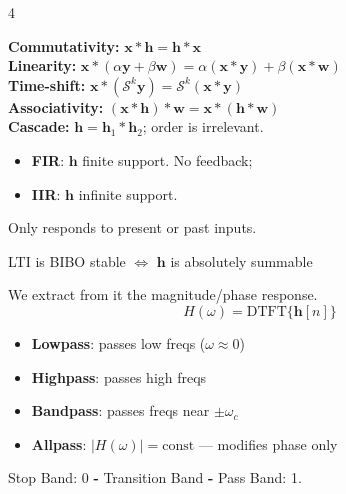 \documentclass[8pt,a4paper,landscape]{extarticle}
\begin{document}
\begin{multicols*}{4}
\begin{prop}[title=Convolution properties]
\textbf{Commutativity:} $\mathbf{x}*\mathbf{h}=\mathbf{h}*\mathbf{x}$\\
\textbf{Linearity:} $\mathbf{x}*(\alpha\mathbf{y}+\beta\mathbf{w})=\alpha(\mathbf{x}*\mathbf{y})+\beta(\mathbf{x}*\mathbf{w})$\\
\textbf{Time-shift:} $\mathbf{x}*(\mathcal{S}^k\mathbf{y})=\mathcal{S}^k(\mathbf{x}*\mathbf{y})$\\
\textbf{Associativity:} $(\mathbf{x}*\mathbf{h})*\mathbf{w}=\mathbf{x}*(\mathbf{h}*\mathbf{w})$\\
\textbf{Cascade:} $\mathbf{h}=\mathbf{h}_1*\mathbf{h}_2$; order is irrelevant.
\end{prop}

\begin{defn}[title=FIR vs IIR (Finite/Infinite Impulse Response)]
\begin{itemize}
  \item \textbf{FIR}: $\mathbf{h}$ finite support. No feedback;
  \item \textbf{IIR}: $\mathbf{h}$ infinite support.
\end{itemize}
\end{defn}

\begin{defn}[title=Definition of causal]
Only responds to present or past inputs.
\end{defn}

\begin{thm}[title=BIBO Stability]
LTI is BIBO stable $\Longleftrightarrow$ $\mathbf{h}$ is absolutely summable
\end{thm}

\begin{thm}[title=Frequency Response]
We extract from it the magnitude/phase response.
\[H(\omega)= \mathrm{DTFT}\{\boldsymbol{h}[n]\} \]
\end{thm}

\begin{prop}[title=Filter types by magnitude response]
\begin{itemize}
  \item \textbf{Lowpass}: passes low freqs ($\omega\approx 0$)
  \item \textbf{Highpass}: passes high freqs
  \item \textbf{Bandpass}: passes freqs near $\pm\omega_c$
  \item \textbf{Allpass}: $|H(\omega)|=\text{const}$ — modifies phase only
\end{itemize}
Stop Band: 0 \textbf{-} Transition Band \textbf{-} Pass Band: 1.
\end{prop}


\end{multicols*}
\end{document}

